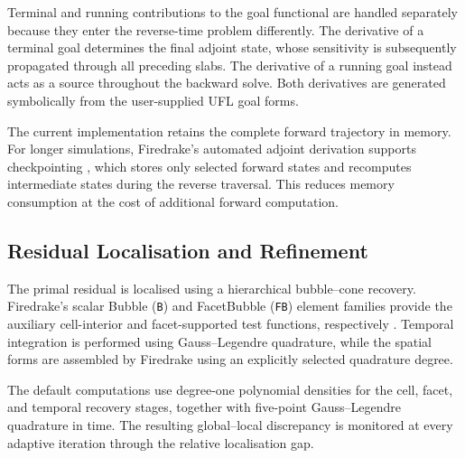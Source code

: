 Terminal and running contributions to the goal functional are handled separately because they enter the reverse-time problem differently. The derivative of a terminal goal determines the final adjoint state, whose sensitivity is subsequently propagated through all preceding slabs. The derivative of a running goal instead acts as a source throughout the backward solve. Both derivatives are generated symbolically from the user-supplied UFL goal forms.


The current implementation retains the complete forward trajectory in memory. For longer simulations, Firedrake's automated adjoint derivation supports checkpointing \cite{checkpointing}, which stores only selected forward states and recomputes intermediate states during the reverse traversal. This reduces memory consumption at the cost of additional forward computation.



\subsection{Residual Localisation and Refinement}

The primal residual is localised using a hierarchical bubble--cone recovery. Firedrake's scalar Bubble (\texttt{B}) and FacetBubble (\texttt{FB}) element families provide the auxiliary cell-interior and facet-supported test functions, respectively \cite{Firedrake}.
Temporal integration is performed using Gauss--Legendre quadrature, while the spatial forms are assembled by Firedrake using an explicitly selected quadrature degree.

The default computations use degree-one polynomial densities for the cell, facet, and temporal recovery stages, together with five-point Gauss--Legendre quadrature in time. The resulting global--local discrepancy is monitored at every adaptive iteration through the relative localisation gap. 

